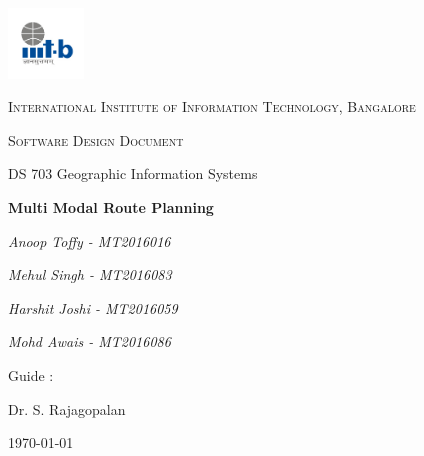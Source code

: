 \documentclass[12pt,a4paper]{article}
\begin{document}
\begin{titlepage}
	\centering
	\includegraphics[width=0.15\textwidth]{IIIT-B_logo.jpg}\par\vspace{1cm}
	{\scshape\LARGE International Institute of Information Technology, Bangalore \par}
	\vspace{1cm}
	{\scshape\Large Software Design Document\par}
	{\Large DS 703 Geographic Information Systems\par}
	\vspace{1.5cm}
	{\huge\bfseries Multi Modal Route Planning\par}
	\vspace{2cm}	   
	{\Large\itshape Anoop Toffy - MT2016016\par}
	{\Large\itshape Mehul Singh - MT2016083\par}		 
	{\Large\itshape Harshit Joshi - MT2016059\par}	 
	{\Large\itshape Mohd Awais - MT2016086\par}
	\vfill
	Guide : \par
	Dr. S. Rajagopalan

	\vfill

	{\large \today\par}
\end{titlepage}


\tableofcontents
\listoffigures
\listoftables
\newpage
\end{document}
